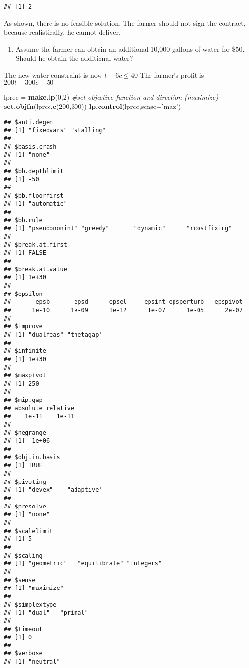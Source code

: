 \documentclass[]{article}
\newenvironment{Shaded}{\begin{snugshade}}{\end{snugshade}}
\newcommand{\KeywordTok}[1]{\textcolor[rgb]{0.13,0.29,0.53}{\textbf{#1}}}
\newcommand{\DataTypeTok}[1]{\textcolor[rgb]{0.13,0.29,0.53}{#1}}
\newcommand{\DecValTok}[1]{\textcolor[rgb]{0.00,0.00,0.81}{#1}}
\newcommand{\StringTok}[1]{\textcolor[rgb]{0.31,0.60,0.02}{#1}}
\newcommand{\CommentTok}[1]{\textcolor[rgb]{0.56,0.35,0.01}{\textit{#1}}}
\newcommand{\NormalTok}[1]{#1}
\providecommand{\tightlist}{%
  \setlength{\itemsep}{0pt}\setlength{\parskip}{0pt}}
\begin{document}
\begin{verbatim}
## [1] 2
\end{verbatim}

As shown, there is no feasible solution. The farmer should not sign the
contract, because realistically, he cannot deliver.

\begin{enumerate}
\def\labelenumi{(\alph{enumi})}
\setcounter{enumi}{2}
\tightlist
\item
  Assume the farmer can obtain an additional 10,000 gallons of water for
  \$50. Should he obtain the additional water?
\end{enumerate}

The new water constraint is now \(t + 6c \leq 40\) The farmer's profit
is \(200t + 300c - 50\)

\begin{Shaded}
\begin{Highlighting}[]
\NormalTok{lprec =}\StringTok{ }\KeywordTok{make.lp}\NormalTok{(}\DecValTok{0}\NormalTok{,}\DecValTok{2}\NormalTok{)}
\CommentTok{#set objective function and direction (maximize)}
\KeywordTok{set.objfn}\NormalTok{(lprec,}\KeywordTok{c}\NormalTok{(}\DecValTok{200}\NormalTok{,}\DecValTok{300}\NormalTok{))}
\KeywordTok{lp.control}\NormalTok{(lprec,}\DataTypeTok{sense=}\StringTok{'max'}\NormalTok{)}
\end{Highlighting}
\end{Shaded}

\begin{verbatim}
## $anti.degen
## [1] "fixedvars" "stalling" 
## 
## $basis.crash
## [1] "none"
## 
## $bb.depthlimit
## [1] -50
## 
## $bb.floorfirst
## [1] "automatic"
## 
## $bb.rule
## [1] "pseudononint" "greedy"       "dynamic"      "rcostfixing" 
## 
## $break.at.first
## [1] FALSE
## 
## $break.at.value
## [1] 1e+30
## 
## $epsilon
##       epsb       epsd      epsel     epsint epsperturb   epspivot 
##      1e-10      1e-09      1e-12      1e-07      1e-05      2e-07 
## 
## $improve
## [1] "dualfeas" "thetagap"
## 
## $infinite
## [1] 1e+30
## 
## $maxpivot
## [1] 250
## 
## $mip.gap
## absolute relative 
##    1e-11    1e-11 
## 
## $negrange
## [1] -1e+06
## 
## $obj.in.basis
## [1] TRUE
## 
## $pivoting
## [1] "devex"    "adaptive"
## 
## $presolve
## [1] "none"
## 
## $scalelimit
## [1] 5
## 
## $scaling
## [1] "geometric"   "equilibrate" "integers"   
## 
## $sense
## [1] "maximize"
## 
## $simplextype
## [1] "dual"   "primal"
## 
## $timeout
## [1] 0
## 
## $verbose
## [1] "neutral"
\end{verbatim}
\end{document}
